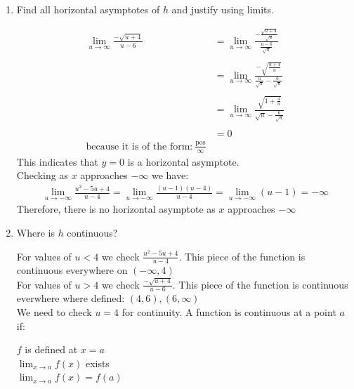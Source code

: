 \documentclass[nooutcomes]{ximera}
\begin{document}
\begin{problem}
\begin{enumerate}
	\item Find all horizontal asymptotes of $h$ and justify using limits.
	\begin{freeResponse}
	\begin{align*}
	\lim_{u \to \infty}\frac{-\sqrt{u+4}}{u - 6}&=\lim_{u \to \infty}\frac{-\frac{\sqrt{u+4}}{\sqrt{u}}}{\frac{u - 6}{\sqrt{u}}}\\ \\
	&=\lim_{u \to \infty}\frac{-\sqrt{\frac{u+4}{u}}}{\frac{u}{\sqrt{u}} - \frac{6}{\sqrt{u}}}\\ \\
	&=\lim_{u \to \infty}\frac{\sqrt{1+\frac{4}{u}}}{\sqrt{u} - \frac{6}{\sqrt{u}}}\\ \\
	&=0\\ \text{because it is of the form:}\ \frac{\text{pos}}{\infty}
	\end{align*}
	This indicates that $y=0$ is a horizontal asymptote.\\
	Checking as $x$ approaches $-\infty$ we have:
	\begin{align*}
	\lim_{u \to -\infty}\frac{u^2-5u+4}{u - 4}=\lim_{u \to -\infty} \frac{(u-1)(u-4)}{u - 4}=\lim_{u \to -\infty} (u-1)= -\infty
	\end{align*}
 Therefore, there is no horizontal asymptote as $x$ approaches $-\infty$
	
	\end{freeResponse}

	\item Where is $h$ continuous?

	\begin{freeResponse}
		For values of $u<4$ we check $\frac{u^2-5u+4}{u - 4}$.  This piece of the function is continuous everywhere on $(-\infty,4)$ \\
	For values of $u>4$ we check $\frac{-\sqrt{u+4}}{u - 6}$. This piece of the function is continuous everwhere where defined: $(4,6),(6,\infty)$\\

	We need to check $u=4$ for continuity. A function is continuous at a point $a$ if:
	\begin{center}
	  $f$ is defined at $x = a$\\

     	 $\lim_{x \to a} f(x)$ exists\\

    	  $\lim_{x \to a} f(x) = f(a)$
	\end{center}


\end{freeResponse}
\end{enumerate}
\end{problem}
\end{document}
